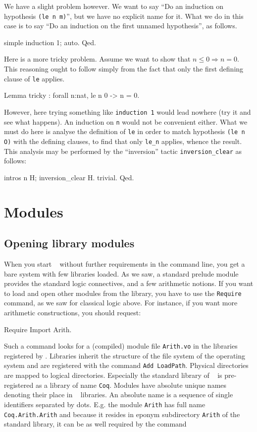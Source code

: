 \documentclass[11pt,a4paper]{book}
\begin{document}
We have a slight problem however. We want to say ``Do an induction on
hypothesis \verb:(le n m):'', but we have no explicit name for it. What we
do in this case is to say ``Do an induction on the first unnamed hypothesis'',
as follows.
\begin{coq_example}
simple induction 1; auto.
Qed.
\end{coq_example}

Here is a more tricky problem. Assume we want to show that
$n\le 0 \Rightarrow n=0$. This reasoning ought to follow simply from the
fact that only the first defining clause of \verb:le: applies.
\begin{coq_example} 
Lemma tricky : forall n:nat, le n 0 -> n = 0.
\end{coq_example}

However, here trying something like \verb:induction 1: would lead
nowhere (try it and see what happens). 
An induction on \verb:n: would not be convenient either.
What we must do here is analyse the definition of \verb"le" in order
to match hypothesis \verb:(le n O): with the defining clauses, to find
that only \verb:le_n: applies, whence the result. 
This analysis may be performed by the ``inversion'' tactic
\verb:inversion_clear: as follows:
\begin{coq_example} 
intros n H; inversion_clear H.
trivial.
Qed.
\end{coq_example}

\chapter{Modules}

\section{Opening library modules}

When you start \Coq~ without further requirements in the command line,
you get a bare system with few libraries loaded.  As we saw, a standard
prelude module provides the standard logic connectives, and a few
arithmetic notions. If you want to load and open other modules from
the library, you have to use the \verb"Require" command, as we saw for
classical logic above. For instance, if you want more arithmetic
constructions, you should request:
\begin{coq_example*}
Require Import Arith.
\end{coq_example*}

Such a command looks for a (compiled) module file \verb:Arith.vo: in
the libraries registered by \Coq. Libraries inherit the structure of
the file system of the operating system and are registered with the
command \verb:Add LoadPath:. Physical directories are mapped to
logical directories. Especially the standard library of \Coq~ is
pre-registered as a library of name \verb=Coq=.  Modules have absolute
unique names denoting their place in \Coq~ libraries.  An absolute
name is a sequence of single identifiers separated by dots.  E.g. the
module \verb=Arith= has full name \verb=Coq.Arith.Arith= and because
it resides in eponym subdirectory \verb=Arith= of the standard
library, it can be as well required by the command
\end{document}
